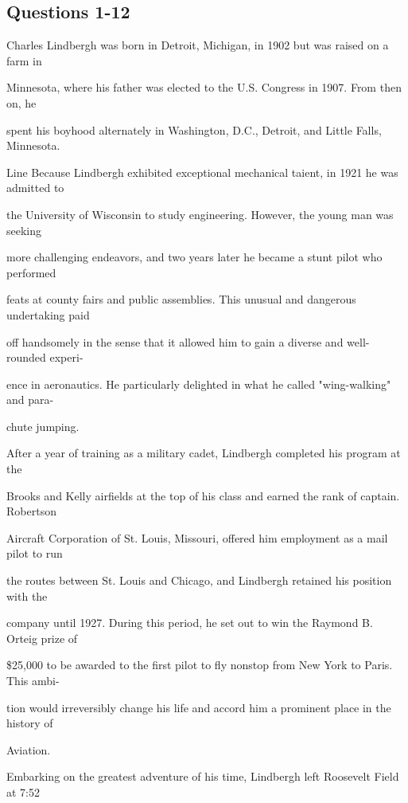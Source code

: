\documentclass[12pt]{article}
\begin{document}
\subsection*{Questions 1-12}
\begingroup
\small
\sloppy
\setlength{\parskip}{0pt}
\setlength{\parindent}{0pt}
Charles Lindbergh was born in Detroit, Michigan, in 1902 but was raised on a farm in\par
Minnesota, where his father was elected to the U.S. Congress in 1907. From then on, he\par
spent his boyhood alternately in Washington, D.C., Detroit, and Little Falls, Minnesota.\par
Line Because Lindbergh exhibited exceptional mechanical taient, in 1921 he was admitted to\par
the University of Wisconsin to study engineering. However, the young man was seeking\par
more challenging endeavors, and two years later he became a stunt pilot who performed\par
feats at county fairs and public assemblies. This unusual and dangerous undertaking paid\par
off handsomely in the sense that it allowed him to gain a diverse and well-rounded experi-\par
ence in aeronautics. He particularly delighted in what he called "wing-walking" and para-\par
chute jumping.\par
After a year of training as a military cadet, Lindbergh completed his program at the\par
Brooks and Kelly airfields at the top of his class and earned the rank of captain. Robertson\par
Aircraft Corporation of St. Louis, Missouri, offered him employment as a mail pilot to run\par
the routes between St. Louis and Chicago, and Lindbergh retained his position with the\par
company until 1927. During this period, he set out to win the Raymond B. Orteig prize of\par
\$25,000 to be awarded to the first pilot to fly nonstop from New York to Paris. This ambi-\par
tion would irreversibly change his life and accord him a prominent place in the history of\par
Aviation.\par
Embarking on the greatest adventure of his time, Lindbergh left Roosevelt Field at 7:52\par
\end{document}
